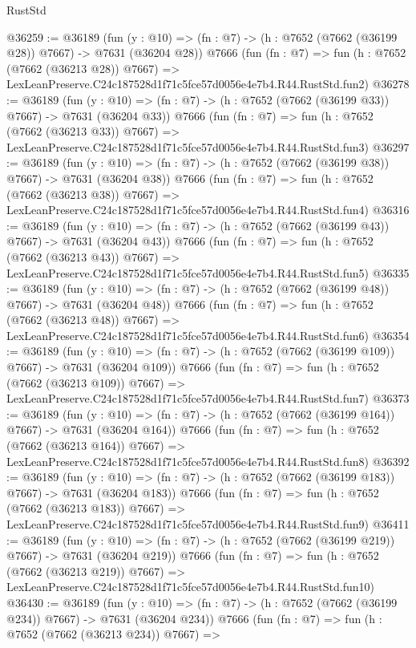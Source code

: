 \begin{lexlean}{RustStd}
\begin{coremodule}
@36259 := @36189
    (fun (y : @10) => (fn : @7) -> (h : @7652 (@7662 (@36199 @28)) @7667) -> @7631 (@36204 @28))
    @7666
    (fun (fn : @7) =>
    fun (h : @7652 (@7662 (@36213 @28)) @7667) =>
    LexLeanPreserve.C24c187528d1f71c5fce57d0056e4e7b4.R44.RustStd.fun2)
@36278 := @36189
    (fun (y : @10) => (fn : @7) -> (h : @7652 (@7662 (@36199 @33)) @7667) -> @7631 (@36204 @33))
    @7666
    (fun (fn : @7) =>
    fun (h : @7652 (@7662 (@36213 @33)) @7667) =>
    LexLeanPreserve.C24c187528d1f71c5fce57d0056e4e7b4.R44.RustStd.fun3)
@36297 := @36189
    (fun (y : @10) => (fn : @7) -> (h : @7652 (@7662 (@36199 @38)) @7667) -> @7631 (@36204 @38))
    @7666
    (fun (fn : @7) =>
    fun (h : @7652 (@7662 (@36213 @38)) @7667) =>
    LexLeanPreserve.C24c187528d1f71c5fce57d0056e4e7b4.R44.RustStd.fun4)
@36316 := @36189
    (fun (y : @10) => (fn : @7) -> (h : @7652 (@7662 (@36199 @43)) @7667) -> @7631 (@36204 @43))
    @7666
    (fun (fn : @7) =>
    fun (h : @7652 (@7662 (@36213 @43)) @7667) =>
    LexLeanPreserve.C24c187528d1f71c5fce57d0056e4e7b4.R44.RustStd.fun5)
@36335 := @36189
    (fun (y : @10) => (fn : @7) -> (h : @7652 (@7662 (@36199 @48)) @7667) -> @7631 (@36204 @48))
    @7666
    (fun (fn : @7) =>
    fun (h : @7652 (@7662 (@36213 @48)) @7667) =>
    LexLeanPreserve.C24c187528d1f71c5fce57d0056e4e7b4.R44.RustStd.fun6)
@36354 := @36189
    (fun (y : @10) => (fn : @7) -> (h : @7652 (@7662 (@36199 @109)) @7667) -> @7631 (@36204 @109))
    @7666
    (fun (fn : @7) =>
    fun (h : @7652 (@7662 (@36213 @109)) @7667) =>
    LexLeanPreserve.C24c187528d1f71c5fce57d0056e4e7b4.R44.RustStd.fun7)
@36373 := @36189
    (fun (y : @10) => (fn : @7) -> (h : @7652 (@7662 (@36199 @164)) @7667) -> @7631 (@36204 @164))
    @7666
    (fun (fn : @7) =>
    fun (h : @7652 (@7662 (@36213 @164)) @7667) =>
    LexLeanPreserve.C24c187528d1f71c5fce57d0056e4e7b4.R44.RustStd.fun8)
@36392 := @36189
    (fun (y : @10) => (fn : @7) -> (h : @7652 (@7662 (@36199 @183)) @7667) -> @7631 (@36204 @183))
    @7666
    (fun (fn : @7) =>
    fun (h : @7652 (@7662 (@36213 @183)) @7667) =>
    LexLeanPreserve.C24c187528d1f71c5fce57d0056e4e7b4.R44.RustStd.fun9)
@36411 := @36189
    (fun (y : @10) => (fn : @7) -> (h : @7652 (@7662 (@36199 @219)) @7667) -> @7631 (@36204 @219))
    @7666
    (fun (fn : @7) =>
    fun (h : @7652 (@7662 (@36213 @219)) @7667) =>
    LexLeanPreserve.C24c187528d1f71c5fce57d0056e4e7b4.R44.RustStd.fun10)
@36430 := @36189
    (fun (y : @10) => (fn : @7) -> (h : @7652 (@7662 (@36199 @234)) @7667) -> @7631 (@36204 @234))
    @7666
    (fun (fn : @7) =>
    fun (h : @7652 (@7662 (@36213 @234)) @7667) =>

\end{coremodule}
\end{lexlean}
